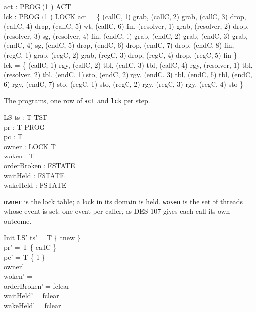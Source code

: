 \documentclass[a4paper,10pt,fleqn]{article}
\begin{document}
\begin{axdef}
  act : PROG \cross (1 ) \pfun ACT \\
  lck : PROG \cross (1 ) \pfun LOCK
\where
  act = \{ (callC, 1) \mapsto grab, (callC, 2) \mapsto grab,
    (callC, 3) \mapsto drop, (callC, 4) \mapsto drop, (callC, 5) \mapsto wt,
    (callC, 6) \mapsto fin,
    (resolver, 1) \mapsto grab, (resolver, 2) \mapsto drop,
    (resolver, 3) \mapsto sg, (resolver, 4) \mapsto fin,
    (endC, 1) \mapsto grab, (endC, 2) \mapsto grab, (endC, 3) \mapsto grab,
    (endC, 4) \mapsto sg, (endC, 5) \mapsto drop, (endC, 6) \mapsto drop,
    (endC, 7) \mapsto drop, (endC, 8) \mapsto fin,
    (regC, 1) \mapsto grab, (regC, 2) \mapsto grab, (regC, 3) \mapsto drop,
    (regC, 4) \mapsto drop, (regC, 5) \mapsto fin \} \\
  lck = \{ (callC, 1) \mapsto rgy, (callC, 2) \mapsto tbl,
    (callC, 3) \mapsto tbl, (callC, 4) \mapsto rgy,
    (resolver, 1) \mapsto tbl, (resolver, 2) \mapsto tbl,
    (endC, 1) \mapsto sto, (endC, 2) \mapsto rgy, (endC, 3) \mapsto tbl,
    (endC, 5) \mapsto tbl, (endC, 6) \mapsto rgy, (endC, 7) \mapsto sto,
    (regC, 1) \mapsto sto, (regC, 2) \mapsto rgy, (regC, 3) \mapsto rgy,
    (regC, 4) \mapsto sto \}
\end{axdef}

The programs, one row of \texttt{act} and \texttt{lck} per step.

\begin{schema}{LS}
  ts : T \fun TST \\
  pr : T \fun PROG \\
  pc : T   \\
  owner : LOCK \pfun T \\
  woken : \power T \\
  orderBroken : FSTATE \\
  waitHeld : FSTATE \\
  wakeHeld : FSTATE
\end{schema}

\texttt{owner} is the lock table; a lock in its domain is held.
\texttt{woken} is the set of threads whose event is set: one event per
caller, as DES-107 gives each call its own outcome.

\begin{schema}{Init}
  LS'
\where
  ts' = T \cross \{ tnew \} \\
  pr' = T \cross \{ callC \} \\
  pc' = T \cross \{ 1 \} \\
  owner' = \emptyset \\
  woken' = \emptyset \\
  orderBroken' = fclear \\
  waitHeld' = fclear \\
  wakeHeld' = fclear
\end{schema}
\end{document}
